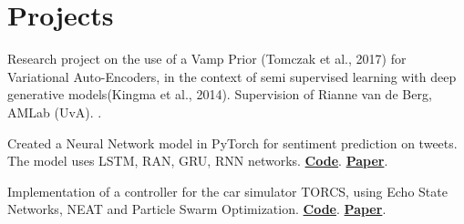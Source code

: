 \documentclass[a4paper]{deedy-resume} %
\begin{document}
\begin{minipage}[t]{0.66\textwidth}
\begin{tightitemize}
\end{tightitemize}

\sectionspace %


\section{Projects}


Research project on the use of a Vamp Prior (Tomczak et al., 2017) for Variational Auto-Encoders, in the context of semi supervised learning with deep generative models(Kingma et al., 2014). Supervision of Rianne van de Berg, AMLab (UvA).
. %

\sectionspace %




Created a Neural Network model in PyTorch for sentiment prediction on tweets. The model uses LSTM, RAN, GRU, RNN networks. \href{https://github.com/davide-belli/twitter-sentiment-analysis}{\bf Code}. \href{https://drive.google.com/file/d/1lc4LsD1EB9YuhgFBXjOJwGOuPpviZUAn/view?usp=sharing}{\bf Paper}.

\sectionspace %



Implementation of a controller for the car simulator TORCS, using Echo State Networks, NEAT and Particle Swarm Optimization. \href{https://github.com/Gabri95/NEAT_competition}{\bf Code}. \href{https://drive.google.com/file/d/16B28JfZg-WyhPj26YNI4CXV6YZNqat4K/view?usp=sharing}{\bf Paper}.

\sectionspace %



\end{minipage}
\end{document}
